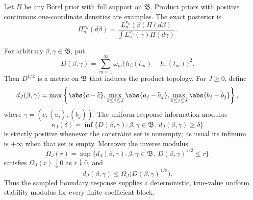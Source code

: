 Let \(\Pi\) be any Borel prior with full support on \(\mathfrak B\).  Product
priors with positive continuous one-coordinate densities are examples.  The
exact posterior is
\[
 \Pi_n^{\nu_n}(d\beta)
 =\frac{L_n^{\nu_n}(\beta)\Pi(d\beta)}
        {\int L_n^{\nu_n}(\gamma)\Pi(d\gamma)}.
\]

\begin{proposition}
\label{prop:jacobi-response-geometry}
For arbitrary \(\beta,\gamma\in\mathfrak B\), put
\begin{equation}
 D(\beta,\gamma)=\sum_{m=1}^{\infty}\omega_m
 \{h_\beta(t_m)-h_\gamma(t_m)\}^2.
 \label{eq:two-point-response-metric}
\end{equation}
Then \(D^{1/2}\) is a metric on \(\mathfrak B\) that induces the product
topology.  For \(J\ge0\), define
\[
 d_J(\beta,\gamma)=\max\left\{\abs{c-\widetilde c},
 \max_{0\le j\le J}\abs{a_j-\widetilde a_j},
 \max_{0\le j\le J}\abs{b_j-\widetilde b_j}\right\},
\]
where \(\gamma=(\widetilde c,(\widetilde a_j),(\widetilde b_j))\).  The
uniform response-information modulus
\begin{equation}
 \kappa_J(\delta)=
 \inf\{D(\beta,\gamma):\beta,\gamma\in\mathfrak B,
                         \ d_J(\beta,\gamma)\ge\delta\}
 \label{eq:jacobi-separation-modulus}
\end{equation}
is strictly positive whenever the constraint set is nonempty; as usual its
infimum is \(+\infty\) when that set is empty.  Moreover the inverse modulus
\begin{equation}
 \Omega_J(r)=\sup\{d_J(\beta,\gamma):\beta,\gamma\in\mathfrak B,
                         \ D(\beta,\gamma)^{1/2}\le r\}
 \label{eq:jacobi-inverse-modulus}
\end{equation}
satisfies \(\Omega_J(r)\downarrow0\) as \(r\downarrow0\), and
\[
 d_J(\beta,\gamma)\le
 \Omega_J\bigl(D(\beta,\gamma)^{1/2}\bigr).
\]
Thus the sampled boundary response supplies a deterministic, true-value
uniform stability modulus for every finite coefficient block.
\end{proposition}

